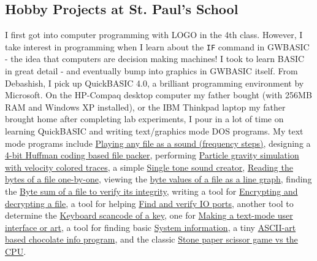 \subsection{Hobby Projects at St. Paul's School}

I first got into computer programming with LOGO in the 4th class. However, I take interest in programming when I learn about the \verb|IF| command in GWBASIC - the idea that computers are decision making machines! I took to learn BASIC in great detail - and eventually bump into graphics in GWBASIC itself. From Debashish, I pick up QuickBASIC 4.0, a brilliant programming environment by Microsoft. On the HP-Compaq desktop computer my father bought (with 256MB RAM and Windows XP installed), or the IBM Thinkpad laptop my father brought home after completing lab experiments, I pour in a lot of time on learning QuickBASIC and writing text/graphics mode DOS programs. My text mode programs include \href{https://github.com/qb40/file-sound}{Playing any file as a sound (frequency steps)}, designing a \href{https://github.com/qb40/file-pack}{4-bit Huffman coding based file packer}, performing \href{https://github.com/qb40/gravity-simulation}{Particle gravity simulation with velocity colored traces}, a simple \href{https://github.com/qb40/sound-creator}{Single tone sound creator}, \href{https://github.com/qb40/file-bytes}{Reading the bytes of a file one-by-one}, viewing the \href{https://github.com/qb40/file-graph}{byte values of a file as a line graph}, finding the \href{https://github.com/qb40/file-byte-sum}{Byte sum of a file to verify its integrity}, writing a tool for \href{https://github.com/qb40/file-encrypt}{Encrypting and decrypting a file}, a tool for helping \href{https://github.com/qb40/port-io-helper}{Find and verify IO ports}, another tool to determine the \href{https://github.com/qb40/keyboard-scancode}{Keyboard scancode of a key}, one for \href{https://github.com/qb40/text-draw}{Making a text-mode user interface or art}, a tool for finding basic \href{https://github.com/qb40/system-information}{System information}, a tiny \href{https://github.com/qb40/chocolate-info}{ASCII-art based chocolate info program}, and the classic \href{https://github.com/qb40/stone-paper-scissor}{Stone paper scissor game vs the CPU}.

